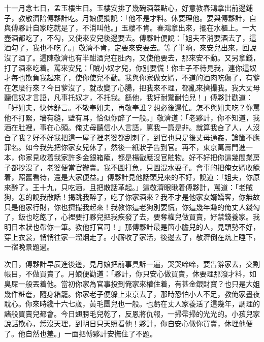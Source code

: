 十一月念七日，孟玉樓生日。玉樓安排了幾碗酒菜點心，好意教春鴻拿出前邊鋪子，教敬濟陪傅夥計吃。月娘便攔說：「他不是才料。休要理他。{}要與傅夥計，自與傅夥計自家吃就是了，不消叫他。」玉樓不肯。{}春鴻拿出來，擺在水櫃上。一大壺酒都吃了，不勾，又使來安兒後邊要去。傅夥計便說：「姐夫不消要酒去了，這酒勾了，我也不吃了。」敬濟不肯，定要來安要去。等了半晌，來安兒出來，回說沒了酒了。這陳敬濟也有半酣酒兒在肚內，又使他要去，那來安不動。又另拿錢，打了酒來吃着。罵來安兒：「賊小奴才兒，你別要慌！你主子不待見我，連你這奴才每也欺負我起來了，使你使兒不動。我與你家做女婿，不道的酒肉吃傷了，有爹在怎麼行來？今日爹沒了，就改變了心腸，把我來不理，都亂來擠撮我。我大丈母聽信奴才言語，凡事托奴才，不托我。繇他，我好耐驚耐怕兒！」傅夥計勸道：「好姐夫，快休舒言。不敬奉姐夫，再敬奉誰？想必後邊忙。怎不與姐夫吃？你罵他不打緊，墻有縫，壁有耳，恰似你醉了一般。」敬濟道：「老夥計，你不知道，我酒在肚裡，事在心頭。俺丈母聽信小人言語，罵我一篇是非。就算我㒲了人，人沒㒲了我？好不好我把這一屋子裡老婆都刮剌了，到官也只是後丈母通姦，論箇不應罪名。如今我先把你家女兒休了，然後一紙狀子告到官。再不，東京萬壽門進一本，你家見收着我家許多金銀箱籠，都是楊戩應沒官賍物。好不好把你這幾間業房子都抄沒了，老婆便當官辦賣。我不圖打魚，只圖混水耍子。{}會事的把俺女婿收籠着，照舊看待，還是大家便益。」傅夥計見他話頭兒來的不好，說道：「姐夫，你原來醉了。王十九，只吃酒，且把散話革起。」這敬濟眼瞅着傅夥計，罵道：「老賊狗，怎的說我散話！揭跳我醉了，吃了你家酒來？我不才是他家女婿嬌客，你無故只是他家行財，你也擠撮我起來！我教你這老狗別要慌，你這幾年賺的俺丈人錢勾了，飯也吃飽了，心裡要打夥兒把我疾發了去，要奪權兒做買賣，好禁錢養家。{}我明日本狀也帶你一筆。教他打官司！」{}那傅夥計最是箇小膽兒的人，見頭勢不好，穿上衣裳，悄悄往家一溜烟走了。小厮收了家活，後邊去了，敬濟倒在炕上睡下，一宿晚景題過。

次日，傅夥計早辰進後邊，見月娘把前事具訴一遍，哭哭啼啼，要告辭家去，交割帳目，不做買賣了。月娘便勸道：「夥計，你只安心做買賣，休要理那潑才料，如臭屎一般丟着他。當初你家為官事投到俺家來權住着，{}有甚金銀財寶？也只是大姐幾件粧奩，隨身箱籠。你家老子便躲上東京去了，那時恐怕小人不足，教俺家晝夜耽心。你來時纔十六七歲，黃毛團兒也一般。也虧在丈人家養活了這幾年，調理的諸般買賣兒都會。今日翅膀毛兒乾了，反恩將仇報，一掃帚掃的光光的。小孩兒家說話欺心，恁沒天理，到明日只天照看他！夥計，你自安心做你買賣，休理他便了。他自然也羞。」一面把傅夥計安撫住了不題。

